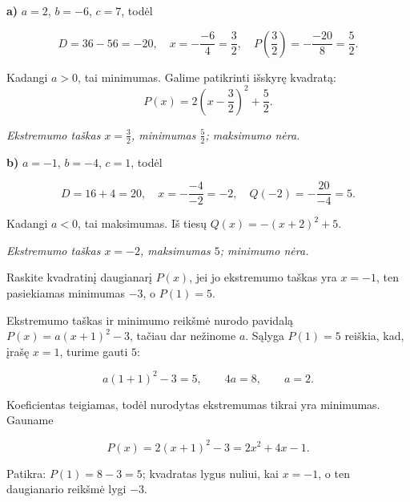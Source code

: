 \documentclass[11pt,a4paper]{scrartcl}
\numberwithin{exercise}{section}
\begin{document}
\begin{solution}\hfill\break

\textbf{a)} $a=2$, $b=-6$, $c=7$, todėl

\[D=36-56=-20,\quad x=-\frac{-6}{4}=\frac32,
\quad P\left(\frac32\right)=-\frac{-20}{8}=\frac52.\]

Kadangi $a>0$, tai minimumas. Galime patikrinti išskyrę kvadratą: $$P(x)=2\left(x-\frac{3}{2}\right)^2+\frac{5}{2}.$$ 

\emph{Ekstremumo taškas $x=\frac32$, minimumas $\frac52$; maksimumo nėra.}



\textbf{b)} $a=-1$, $b=-4$, $c=1$, todėl

\[D=16+4=20,\quad x=-\frac{-4}{-2}=-2,
\quad Q(-2)=-\frac{20}{-4}=5.\]

Kadangi $a<0$, tai maksimumas. Iš tiesų $Q(x)=-(x+2)^2+5$. 

\emph{Ekstremumo taškas $x=-2$, maksimumas $5$; minimumo nėra.}


\end{solution}


\begin{example}\label{pv:atkurti}

Raskite kvadratinį daugianarį $P(x)$, jei jo ekstremumo taškas yra $x=-1$, ten pasiekiamas minimumas $-3$, o $P(1)=5$.

\end{example}

\begin{solution}

Ekstremumo taškas ir minimumo reikšmė nurodo pavidalą $P(x)=a(x+1)^2-3$, tačiau dar nežinome $a$. Sąlyga $P(1)=5$ reiškia, kad, įrašę $x=1$, turime gauti $5$:

\[a(1+1)^2-3=5,\qquad 4a=8,\qquad a=2.\]

Koeficientas teigiamas, todėl nurodytas ekstremumas tikrai yra minimumas. Gauname

\[\boxed{P(x)=2(x+1)^2-3=2x^2+4x-1.}\]

Patikra: $P(1)=8-3=5$; kvadratas lygus nuliui, kai $x=-1$, o ten daugianario reikšmė lygi $-3$.







\end{solution}
\end{document}
